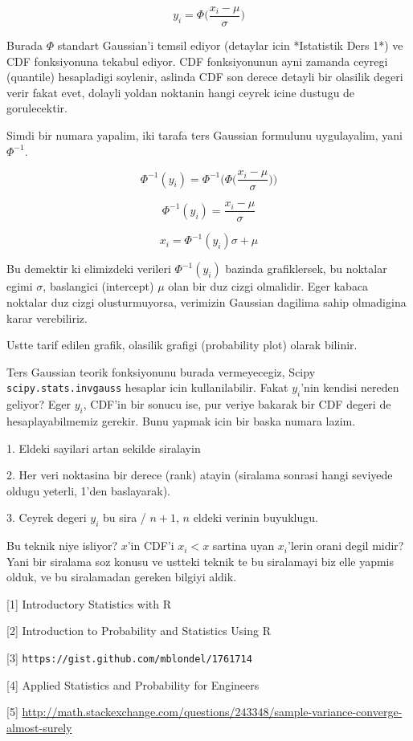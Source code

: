 \documentclass[12pt,fleqn]{article}\usepackage{../common}
\begin{document}
$$ y_i = \Phi\bigg(\frac{ x_i - \mu}{\sigma}\bigg) $$

Burada $\Phi$ standart Gaussian'i temsil ediyor (detaylar icin
*Istatistik Ders 1*) ve CDF fonksiyonuna tekabul ediyor. CDF
fonksiyonunun ayni zamanda ceyregi (quantile) hesapladigi soylenir,
aslinda CDF son derece detayli bir olasilik degeri verir fakat evet,
dolayli yoldan noktanin hangi ceyrek icine dustugu de gorulecektir.

Simdi bir numara yapalim, iki tarafa ters Gaussian formulunu uygulayalim,
yani $\Phi^{-1}$.

$$ \Phi^{-1}(y_i) = \Phi^{-1}\bigg( \Phi\bigg(\frac{ x_i - \mu}{\sigma}\bigg)\bigg) $$

$$ \Phi^{-1}(y_i) = \frac{ x_i - \mu}{\sigma}$$

$$ x_i = \Phi^{-1}(y_i) \sigma + \mu  $$ 

Bu demektir ki elimizdeki verileri $\Phi^{-1}(y_i)$ bazinda grafiklersek,
bu noktalar egimi $\sigma$, baslangici (intercept) $\mu$ olan bir duz cizgi
olmalidir. Eger kabaca noktalar duz cizgi olusturmuyorsa, verimizin 
Gaussian dagilima sahip olmadigina karar verebiliriz. 

Ustte tarif edilen grafik,  olasilik grafigi (probability plot) olarak
bilinir. 

Ters Gaussian teorik fonksiyonunu burada vermeyecegiz, Scipy
\verb!scipy.stats.invgauss! hesaplar icin kullanilabilir. Fakat $y_i$'nin
kendisi nereden geliyor? Eger $y_i$, CDF'in bir sonucu ise, pur veriye
bakarak bir CDF degeri de hesaplayabilmemiz gerekir. Bunu yapmak icin bir
baska numara lazim. 

1. Eldeki sayilari artan sekilde siralayin

2. Her veri noktasina bir derece (rank) atayin (siralama sonrasi hangi
seviyede oldugu yeterli, 1'den baslayarak). 

3. Ceyrek degeri $y_i$ bu sira / $n+1$, $n$ eldeki verinin buyuklugu. 

Bu teknik niye isliyor? $x$'in CDF'i $x_i < x$ sartina uyan $x_i$'lerin
orani degil midir? Yani bir siralama soz konusu ve ustteki teknik te bu
siralamayi biz elle yapmis olduk, ve bu siralamadan gereken bilgiyi aldik. 


[1] Introductory Statistics with R

[2] Introduction to Probability and Statistics Using R

[3] \verb!https://gist.github.com/mblondel/1761714!

[4] Applied Statistics and Probability for Engineers

[5] \url{http://math.stackexchange.com/questions/243348/sample-variance-converge-almost-surely}
\end{document}
